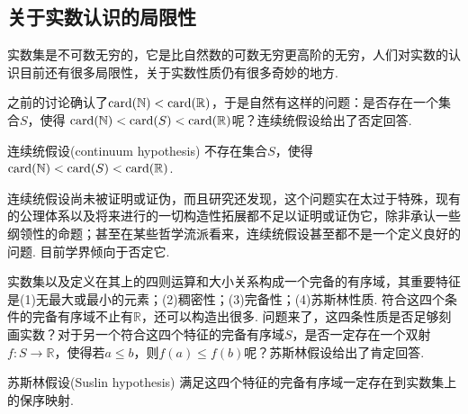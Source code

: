 \documentclass[main.tex]{subfiles}
\begin{document}




\subsection{关于实数认识的局限性}

实数集是不可数无穷的，它是比自然数的可数无穷更高阶的无穷，人们对实数的认识目前还有很多局限性，关于实数性质仍有很多奇妙的地方.

之前的讨论确认了\({\rm card}(\mathbb{N})<{\rm card}(\mathbb{R})\)，于是自然有这样的问题：是否存在一个集合\(S\)，使得 \({\rm card}(\mathbb{N}) < {\rm card}(S) < {\rm card}(\mathbb{R})\)呢？连续统假设给出了否定回答.

\begin{proposition}{连续统假设(continuum hypothesis)}
    不存在集合\(S\)，使得\({\rm card}(\mathbb{N})<{\rm card}(S)<{\rm card}(\mathbb{R})\).
\end{proposition}

连续统假设尚未被证明或证伪，而且研究还发现，这个问题实在太过于特殊，现有的公理体系以及将来进行的一切构造性拓展都不足以证明或证伪它，除非承认一些纲领性的命题；甚至在某些哲学流派看来，连续统假设甚至都不是一个定义良好的问题. 目前学界倾向于否定它.

实数集以及定义在其上的四则运算和大小关系构成一个完备的有序域，其重要特征是(1)无最大或最小的元素；(2)稠密性；(3)完备性；(4)苏斯林性质. 符合这四个条件的完备有序域不止有\(\mathbb{R}\)，还可以构造出很多. 问题来了，这四条性质是否足够刻画实数？对于另一个符合这四个特征的完备有序域\(S\)，是否一定存在一个双射\(f:S\to \mathbb{R}\)，使得若\(a\leq b\)，则\(f(a)\leq f(b)\)呢？苏斯林假设给出了肯定回答.
\begin{proposition}{苏斯林假设(Suslin hypothesis)}
    满足这四个特征的完备有序域一定存在到实数集上的保序映射.
\end{proposition}
\end{document}

